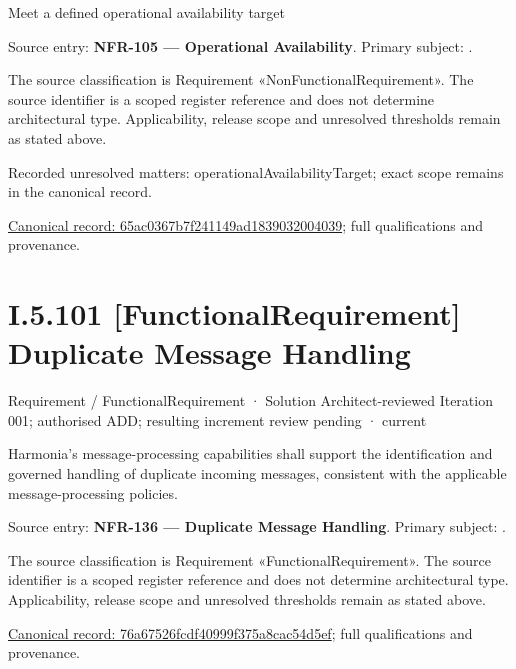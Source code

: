 Meet a defined operational availability target



Source entry: \textbf{NFR-105 — Operational Availability}. Primary subject: \texttt{}.



The source classification is Requirement «NonFunctionalRequirement». The source identifier is a scoped register reference and does not determine architectural type. Applicability, release scope and unresolved thresholds remain as stated above.


{\small Recorded unresolved matters: operationalAvailabilityTarget; exact scope remains in the canonical record.}\par
{\footnotesize \href{../../../../continuum/motivation/requirement/non-functional-requirement/65ac0367b7f241149ad1839032004039.md}{Canonical record: 65ac0367b7f241149ad1839032004039}; full qualifications and provenance.}\par
\section*{I.5.101 [FunctionalRequirement] Duplicate Message Handling}
\label{navigation:I.5.101}

\label{element:76a67526fcdf40999f375a8cac54d5ef}
{\small Requirement / FunctionalRequirement · Solution Architect-reviewed Iteration 001; authorised ADD; resulting increment review pending · current}\par

Harmonia's message-processing capabilities shall support the identification and governed handling of duplicate incoming messages, consistent with the applicable message-processing policies.



Source entry: \textbf{NFR-136 — Duplicate Message Handling}. Primary subject: \texttt{}.



The source classification is Requirement «FunctionalRequirement». The source identifier is a scoped register reference and does not determine architectural type. Applicability, release scope and unresolved thresholds remain as stated above.


{\footnotesize \href{../../../../continuum/motivation/requirement/functional-requirement/76a67526fcdf40999f375a8cac54d5ef.md}{Canonical record: 76a67526fcdf40999f375a8cac54d5ef}; full qualifications and provenance.}\par

